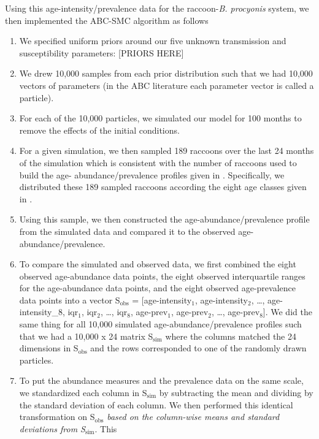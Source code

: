 \documentclass[11pt]{article}
\begin{document}
Using this age-intensity/prevalence data for the raccoon-\emph{B.
procyonis} system, we then implemented the ABC-SMC algorithm as follows \citep{Sisson2009,Toni2009}



\begin{enumerate}
\def\labelenumi{\arabic{enumi}.}
\item
  We specified uniform priors around our five unknown transmission and
  susceptibility parameters: {[}PRIORS HERE{]}
\item
  We drew 10,000 samples from each prior distribution such that we had
  10,000 vectors of parameters (in the ABC literature each parameter
  vector is called a particle).
\item
  For each of the 10,000 particles, we simulated our model for 100
  months to remove the effects of the initial conditions.
\item
  For a given simulation, we then sampled 189 raccoons over the last 24
  months of the simulation which is consistent with the number of
  raccoons used to build the age- abundance/prevalence profiles given in \cite{Weinstein2016}. Specifically, we distributed these 189 sampled
  raccoons according the eight age classes given in \cite{Weinstein2016}.
\item
  Using this sample, we then constructed the age-abundance/prevalence
  profile from the simulated data and compared it to the observed age-
  abundance/prevalence.
\item
  To compare the simulated and observed data, we first combined the
  eight observed age-abundance data points, the eight observed interquartile ranges for the age-abundance data points, and the eight observed
  age-prevalence data points into a vector S$_\text{obs}$ = [age-intensity$_1$,
  age-intensity$_2$, \ldots{}, age-intensity\_8, iqr$_1$, iqr$_2$, \ldots{}, iqr$_8$, age-prev$_1$,
  age-prev$_2$, \ldots{}, age-prev$_8$]. We did the same thing for all
  10,000 simulated age-abundance/prevalence profiles such that we had a
  10,000 x 24 matrix S$_\text{sim}$ where the columns matched the 24 dimensions
  in S$_\text{obs}$ and the rows corresponded to one of the randomly drawn
  particles.
\item
  To put the abundance measures and the prevalence data on the same
  scale, we standardized each column in S$_\text{sim}$ by subtracting the mean
  and dividing by the standard deviation of each column. We then
  performed this identical transformation on S$_\text{obs}$ \emph{based on the
  column-wise means and standard deviations from S$_\text{sim}$}. This

\end{enumerate}
\end{document}
